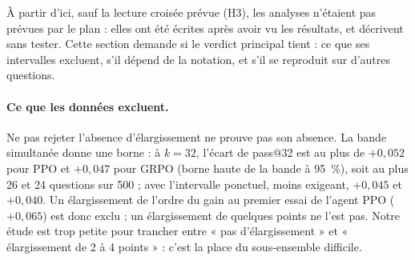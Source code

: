 \documentclass[11pt,a4paper]{article}
\begin{document}
À partir d'ici, sauf la lecture croisée prévue (H3), les analyses n'étaient pas prévues par le plan : elles ont été écrites après avoir vu les résultats, et décrivent sans tester. Cette section demande si le verdict principal tient : ce que ses intervalles excluent, s'il dépend de la notation, et s'il se reproduit sur d'autres questions.

\paragraph{Ce que les données excluent.} Ne pas rejeter l'absence d'élargissement ne prouve pas son absence. La bande simultanée donne une borne : à $k = 32$, l'écart de pass@32 est au plus de $+0{,}052$ pour PPO et $+0{,}047$ pour GRPO (borne haute de la bande à 95~\%), soit au plus 26 et 24 questions sur 500 ; avec l'intervalle ponctuel, moins exigeant, $+0{,}045$ et $+0{,}040$. Un élargissement de l'ordre du gain au premier essai de l'agent PPO ($+0{,}065$) est donc exclu ; un élargissement de quelques points ne l'est pas. Notre étude est trop petite pour trancher entre « pas d'élargissement » et « élargissement de 2 à 4 points » : c'est la place du sous-ensemble difficile.
\end{document}
